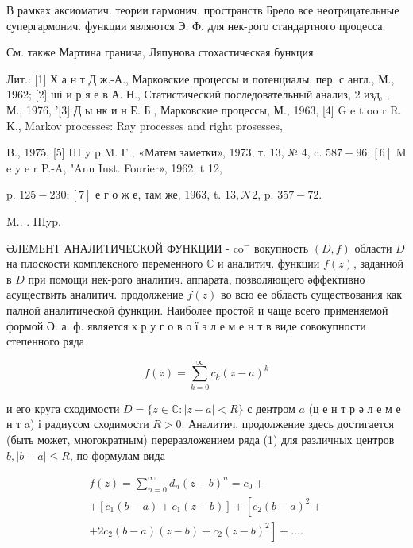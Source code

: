\documentclass[10pt]{article}
\begin{document}
В рамках аксиоматич. теории гармонич. пространств Брело все неотрицательные супергармонич. функции являются Э. Ф. для нек-рого стандартного процесса.



См. также Мартина гранича, Ляпунова стохастическая бункция.



Лит.: [1] Х а н т Д ж.-А., Марковские процессы и потенциалы, пер. с англ., М., 1962; [2] ші и р я е в А. Н., Статистический последовательный анализ, 2 изд, , М., 1976, '[3] Д ы нк и н Е. Б., Марковские процессы, М., 1963, [4] G e t oo r R. K., Markov processes: Ray processes and right prosesses,

B., 1975, [5] III y p M. Г , «Матем заметки», 1973, т. 13, № 4, c. $587-96 ;[6]$ M e y e r P.-A, "Ann Inst. Fourier», 1962, t 12,

p. $125-230 ;[7]$ е г о ж е, там же, 1963, t. $13, \mathcal{N} 2$, p. $357-72$.



M.. . IIIyp.



ӘЛЕМЕНТ АНАЛИТИЧЕСКОЙ ФУНКЦИИ - $\mathrm{co}^{-}$ вокупность $(D, f)$ области $D$ на плоскости комплексного переменного $\mathbb{C}$ и аналитич. функции $f(z)$, заданной в $D$ при помощи нек-рого аналитич. аппарата, позволяющего әффективно асуществить аналитич. продолжение $f(z)$ во всю ее область существования как палной аналитической функции. Наиболее простой и чаще всего применяемой формой Ә. а. ф. является к р у г о в о ї э л е м е н т в виде совокупности степенного ряда



\[

f(z)=\sum_{k=0}^{\infty} c_{k}(z-a)^{k}

\]



и его круга сходимости $D=\{z \in \mathbb{C}:|z-a|<R\}$ с дентром $a$ (ц е н т р ә л е м е н т a) і радиусом сходимости $R>0$. Аналитич. продолжение здесь достигается (быть может, многократным) переразложением ряда (1) для различных центров $b,|b-a| \leqslant R$, по формулам вида



\[

\begin{gathered}

f(z)=\sum_{n=0}^{\infty} d_{n}(z-b)^{n}=c_{0}+ \\

+\left[c_{1}(b-a)+c_{1}(z-b)\right]+\left[c_{2}(b-a)^{2}+\right. \\

\left.+2 c_{2}(b-a)(z-b)+c_{2}(z-b)^{2}\right]+\ldots .

\end{gathered}

\]
\end{document}
